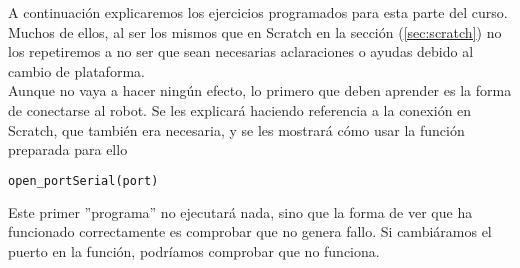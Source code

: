 A continuación explicaremos los ejercicios programados para esta parte del curso. Muchos de ellos, al ser los mismos que en Scratch en la sección (\ref{sec:scratch}) no los repetiremos a no ser que sean necesarias aclaraciones o ayudas debido al cambio de plataforma.\\

Aunque no vaya a hacer ningún efecto, lo primero que deben aprender es la forma de conectarse al robot. Se les explicará haciendo referencia a la conexión en Scratch, que también era necesaria, y se les mostrará cómo usar la función preparada para ello 
\begin{lstlisting}[language=Python]
	open_portSerial(port)
\end{lstlisting}
Este primer ''programa'' no ejecutará nada, sino que la forma de ver que ha funcionado correctamente es comprobar que no genera fallo. Si cambiáramos el puerto en la función, podríamos comprobar que no funciona.
